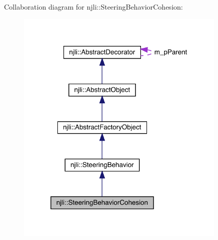 Collaboration diagram for njli\+:\+:Steering\+Behavior\+Cohesion\+:\nopagebreak
\begin{figure}[H]
\begin{center}
\leavevmode
\includegraphics[width=283pt]{classnjli_1_1_steering_behavior_cohesion__coll__graph}
\end{center}
\end{figure}
